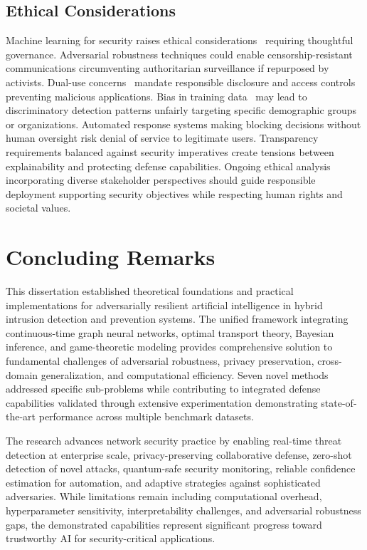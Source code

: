 \subsection*{Ethical Considerations}

Machine learning for security raises ethical considerations~\cite{jobin2019global} requiring thoughtful governance. Adversarial robustness techniques could enable censorship-resistant communications circumventing authoritarian surveillance if repurposed by activists. Dual-use concerns~\cite{brundage2018malicious} mandate responsible disclosure and access controls preventing malicious applications. Bias in training data~\cite{barocas2016big} may lead to discriminatory detection patterns unfairly targeting specific demographic groups or organizations. Automated response systems making blocking decisions without human oversight risk denial of service to legitimate users. Transparency requirements balanced against security imperatives create tensions between explainability and protecting defense capabilities. Ongoing ethical analysis incorporating diverse stakeholder perspectives should guide responsible deployment supporting security objectives while respecting human rights and societal values.

\section*{Concluding Remarks}

This dissertation established theoretical foundations and practical implementations for adversarially resilient artificial intelligence in hybrid intrusion detection and prevention systems. The unified framework integrating continuous-time graph neural networks, optimal transport theory, Bayesian inference, and game-theoretic modeling provides comprehensive solution to fundamental challenges of adversarial robustness, privacy preservation, cross-domain generalization, and computational efficiency. Seven novel methods addressed specific sub-problems while contributing to integrated defense capabilities validated through extensive experimentation demonstrating state-of-the-art performance across multiple benchmark datasets.

The research advances network security practice by enabling real-time threat detection at enterprise scale, privacy-preserving collaborative defense, zero-shot detection of novel attacks, quantum-safe security monitoring, reliable confidence estimation for automation, and adaptive strategies against sophisticated adversaries. While limitations remain including computational overhead, hyperparameter sensitivity, interpretability challenges, and adversarial robustness gaps, the demonstrated capabilities represent significant progress toward trustworthy AI for security-critical applications.

